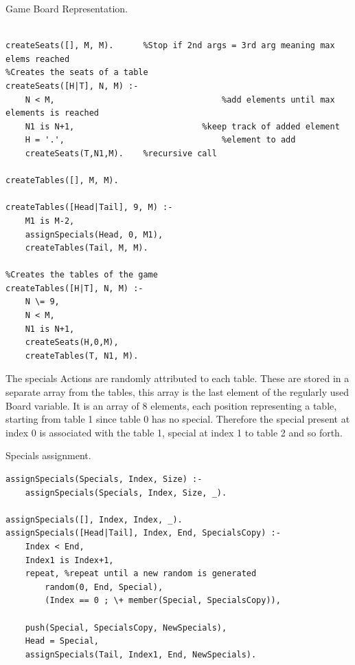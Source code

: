 \documentclass[a4paper]{article}
\begin{document}
\begin{listing}[H]
    \caption{Game Board Representation.}
    \label{Codigo:cod_board}
    \begin{verbatim}

createSeats([], M, M).      %Stop if 2nd args = 3rd arg meaning max elems reached
%Creates the seats of a table
createSeats([H|T], N, M) :-
    N < M,                                  %add elements until max elements is reached
    N1 is N+1,                          %keep track of added element
    H = '.',                                %element to add
    createSeats(T,N1,M).    %recursive call

createTables([], M, M).

createTables([Head|Tail], 9, M) :-
    M1 is M-2,
    assignSpecials(Head, 0, M1),
    createTables(Tail, M, M).

%Creates the tables of the game
createTables([H|T], N, M) :-
    N \= 9,
    N < M,
    N1 is N+1,
    createSeats(H,0,M),
    createTables(T, N1, M).

\end{verbatim}

\end{listing}
\newpage
The specials Actions are randomly attributed to each table. These are stored in a separate array from the tables,
this array is the last element of the regularly used Board variable. It is an array of 8 elements, each position
representing a table, starting from table 1 since table 0 has no special. Therefore the special present at index 0
is associated with the table 1, special at index 1 to table 2 and so forth.

\renewcommand\listingscaption{Code}

\begin{listing}[H]
    \caption{Specials assignment.}
    \label{Codigo:cod_special}
    \begin{verbatim}
assignSpecials(Specials, Index, Size) :-
    assignSpecials(Specials, Index, Size, _).

assignSpecials([], Index, Index, _).
assignSpecials([Head|Tail], Index, End, SpecialsCopy) :-
    Index < End,
    Index1 is Index+1,
    repeat, %repeat until a new random is generated
        random(0, End, Special),
        (Index == 0 ; \+ member(Special, SpecialsCopy)),

    push(Special, SpecialsCopy, NewSpecials),
    Head = Special,
    assignSpecials(Tail, Index1, End, NewSpecials).

\end{verbatim}

\end{listing}
\end{document}
